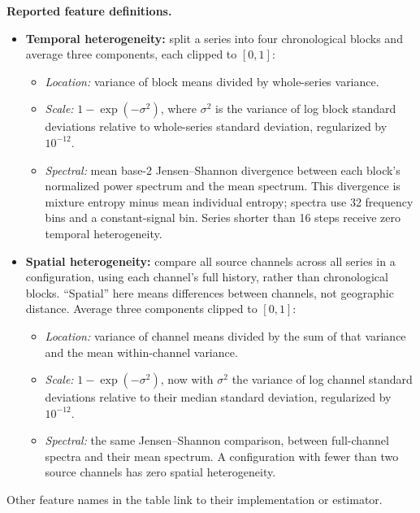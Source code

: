 \documentclass[11pt,a4paper]{article}
\begin{document}
\textbf{Reported feature definitions.}
\begin{itemize}
\item \textbf{Temporal heterogeneity:} split a series into four chronological
blocks and average three components, each clipped to $[0,1]$:
\begin{itemize}
\item \emph{Location:} variance of block means divided by whole-series variance.
\item \emph{Scale:} $1-\exp(-\sigma^2)$, where $\sigma^2$ is the variance
of log block standard deviations relative to whole-series standard deviation,
regularized by $10^{-12}$.
\item \emph{Spectral:} mean base-2 Jensen--Shannon divergence between each
block's normalized power spectrum and the mean spectrum. This divergence
is mixture entropy minus mean individual entropy; spectra use 32 frequency
bins and a constant-signal bin. Series shorter than 16 steps receive zero
temporal heterogeneity.
\end{itemize}
\item \textbf{Spatial heterogeneity:} compare all source channels across
all series in a configuration, using each channel's full history, rather
than chronological blocks. ``Spatial'' here means differences between
channels, not geographic distance. Average three components clipped to $[0,1]$:
\begin{itemize}
\item \emph{Location:} variance of channel means divided by the sum of that
variance and the mean within-channel variance.
\item \emph{Scale:} $1-\exp(-\sigma^2)$, now with $\sigma^2$ the variance of
log channel standard deviations relative to their median standard deviation,
regularized by $10^{-12}$.
\item \emph{Spectral:} the same Jensen--Shannon comparison, between full-channel
spectra and their mean spectrum. A configuration with fewer than two source
channels has zero spatial heterogeneity.
\end{itemize}
\end{itemize}
Other feature names in the table link to their implementation or estimator.

\clearpage
\end{document}
